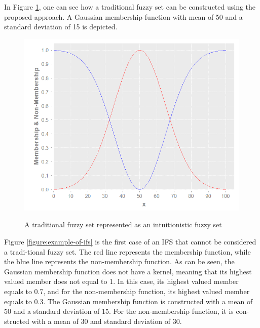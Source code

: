 In Figure \ref{figure:traditional-set-as-ifs}, one can see how a traditional
fuzzy set can be constructed using the proposed approach. A Gaussian membership
function with mean of 50 and a standard deviation of 15 is depicted.

\begin{figure}
\caption{A traditional fuzzy set represented as an intuitionistic fuzzy set}
\centering
\includegraphics[width=1.0\textwidth]{img/traditional-set-as-ifs.png}
\label{figure:traditional-set-as-ifs}
\end{figure}

Figure \ref{figure:example-of-ifs} is the first case of an IFS that cannot be
considered a tradi-tional fuzzy set. The red line represents the membership
function, while the blue line represents the non-membership function. As can be
seen, the Gaussian membership function does not have a kernel, meaning that its
highest valued member does not equal to 1. In this case, its highest valued
member equals to 0.7, and for the non-membership function, its highest valued
member equals to 0.3. The Gaussian membership function is constructed with a
mean of 50 and a standard deviation of 15. For the non-membership function, it
is con-structed with a mean of 30 and standard deviation of 30.


